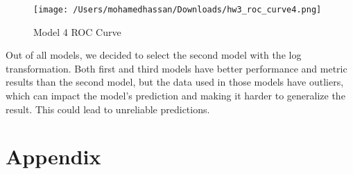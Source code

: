\documentclass[
]{article}
\begin{document}
\begin{figure}
\centering
\texttt{[image: /Users/mohamedhassan/Downloads/hw3\_roc\_curve4.png]}
\caption{Model 4 ROC Curve}
\end{figure}

Out of all models, we decided to select the second model with the log
transformation. Both first and third models have better performance and
metric results than the second model, but the data used in those models
have outliers, which can impact the model's prediction and making it
harder to generalize the result. This could lead to unreliable
predictions.

\section{Appendix}\label{appendix}
\end{document}
